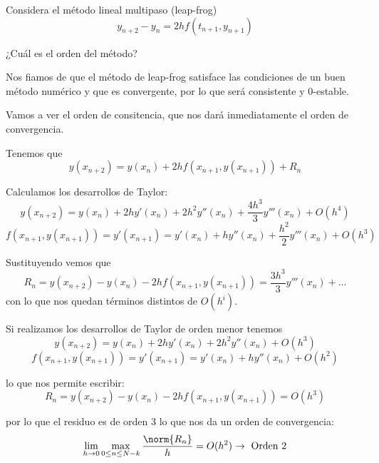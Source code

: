 \begin{problem}[6]
Considera el método lineal multipaso (leap-frog)
\[y_{n+2}-y_n = 2hf(t_{n+1},y_{n+1})\]

¿Cuál es el orden del método?
\solution
{}

Nos fiamos de que el método de leap-frog satisface las condiciones de un buen método numérico y que es convergente, por lo que será consistente y 0-estable.

Vamos a ver el orden de consitencia, que nos dará inmediatamente el orden de convergencia.

Tenemos que
\[y(x_{n+2}) = y(x_n)+2hf(x_{n+1},y(x_{n+1})) + R_n\]

Calculamos los desarrollos de Taylor:
\[y(x_{n+2}) = y(x_n)+2hy'(x_n)+2h^2y''(x_n)+\frac{4h^3}{3}y'''(x_n)+O(h^4)\]
\[f(x_{n+1},y(x_{n+1})) = y'(x_{n+1}) = y'(x_n)+hy''(x_n)+\frac{h^2}{2}y'''(x_n)+ O(h^3)\]

Sustituyendo vemos que 
\[R_n = y(x_{n+2})-y(x_n)-2hf(x_{n+1},y(x_{n+1})) =  \frac{3h^3}{3}y'''(x_n)+ ... \]
con lo que nos quedan términos distintos de $O(h^i)$.

Si realizamos los desarrollos de Taylor de orden menor tenemos
\[y(x_{n+2}) = y(x_n)+2hy'(x_n)+2h^2y''(x_n)+O(h^3)\]
\[f(x_{n+1},y(x_{n+1})) = y'(x_{n+1}) = y'(x_n)+hy''(x_n) + O(h^2)\]

lo que nos permite escribir:
\[R_n = y(x_{n+2})-y(x_n)-2hf(x_{n+1},y(x_{n+1})) = O(h^3)\]

por lo que el residuo es de orden 3 lo que nos da un orden de convergencia:
\[\lim_{h \to 0} \max_{0 \leq n \leq N-k} \frac{\norm{R_n}}{h} = O(h^2) \to \text{ Orden 2}\]
\end{problem}
